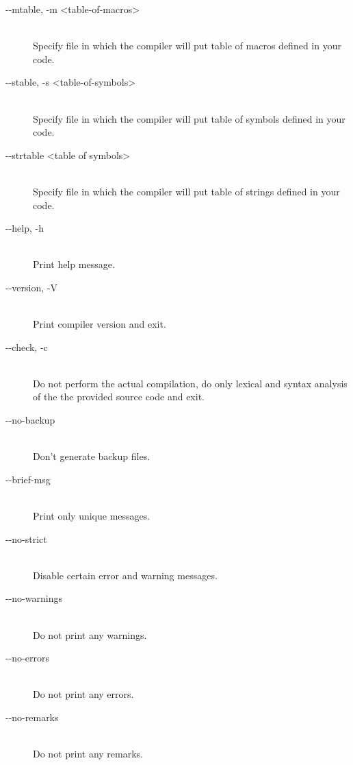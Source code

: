 \begin{description}
            \item[-{}-mtable, -m <table-of-macros>]~\\
                Specify file in which the compiler will put table of macros defined in your code.

            \item[-{}-stable, -s <table-of-symbols>]~\\
                Specify file in which the compiler will put table of symbols defined in your code.

            \item[-{}-strtable <table of symbols>]~\\
                Specify file in which the compiler will put table of strings defined in your code.

            \item[-{}-help, -h]~\\
                Print help message.

            \item[-{}-version, -V]~\\
                Print compiler version and exit.

            \item[-{}-check, -c]~\\
                Do not perform the actual compilation, do only lexical and syntax analysis of the the provided source code and exit.

            \item[-{}-no-backup]~\\
                Don't generate backup files.

            \item[-{}-brief-msg]~\\
                Print only unique messages.

            \item[-{}-no-strict]~\\
                Disable certain error and warning messages.

            \item[-{}-no-warnings]~\\
                Do not print any warnings.

            \item[-{}-no-errors]~\\
                Do not print any errors.

            \item[-{}-no-remarks]~\\
                Do not print any remarks.


\end{description}
